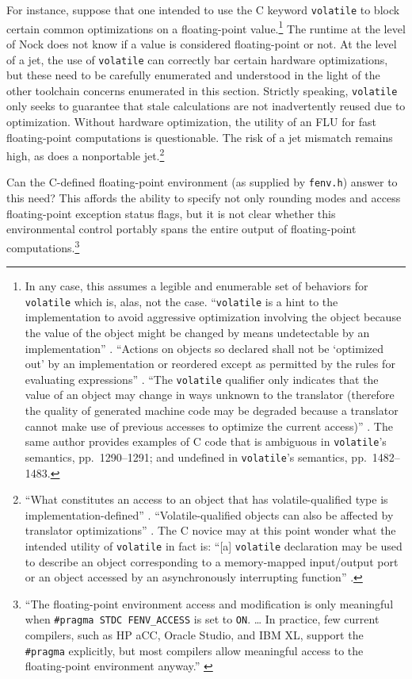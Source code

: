 \documentclass[twoside]{article}
\begin{document}
For instance, suppose that one intended to use the C keyword \texttt{volatile} to block certain common optimizations on a floating-point value.\footnote{In any case, this assumes a legible and enumerable set of behaviors for \texttt{volatile} which is, alas, not the case.  “\texttt{volatile} is a hint to the implementation to avoid aggressive optimization involving the object because the value of the object might be changed by means undetectable by an implementation” \citep[p.~472]{Jones2008}.  “Actions on objects so declared shall not be ‘optimized out’ by an implementation or reordered except as permitted by the rules for evaluating expressions” \citep[p.~1500]{Jones2008}.  “The \texttt{volatile} qualifier only indicates that the value of an object may change in ways unknown to the translator (therefore the quality of generated machine code may be degraded because a translator cannot make use of previous accesses to optimize the current access)” \citep[p.~963]{Jones2008}.  The same author provides examples of C code that is ambiguous in \texttt{volatile}'s semantics, pp.~1290–1291; and undefined in \texttt{volatile}'s semantics, pp.~1482–1483.}  The runtime at the level of Nock does not know if a value is considered floating-point or not.  At the level of a jet, the use of \texttt{volatile} can correctly bar certain hardware optimizations, but these need to be carefully enumerated and understood in the light of the other toolchain concerns enumerated in this section.  Strictly speaking, \texttt{volatile} only seeks to guarantee that stale calculations are not inadvertently reused due to optimization.  Without hardware optimization, the utility of an FLU for fast floating-point computations is questionable.  The risk of a jet mismatch remains high, as does a nonportable jet.\footnote{“What constitutes an access to an object that has volatile-qualified type is implementation-defined” \citep[p.~1488]{Jones2008}.  “Volatile-qualified objects can also be affected by translator optimizations” \citep[p.~1490]{Jones2008}.  The C novice may at this point wonder what the intended utility of \texttt{volatile} in fact is:  “[a] \texttt{volatile} declaration may be used to describe an object corresponding to a memory-mapped input/output port or an object accessed by an asynchronously interrupting function” \citep[p.~1499]{Jones2008}.}

Can the C-defined floating-point environment (as supplied by \texttt{fenv.h}) answer to this need?  This affords the ability to specify not only rounding modes and access floating-point exception status flags, but it is not clear whether this environmental control portably spans the entire output of floating-point computations.\footnote{“The floating-point environment access and modification is only meaningful when \texttt{\#pragma STDC FENV\_ACCESS} is set to \texttt{ON}.  \ldots{} In practice, few current compilers, such as HP aCC, Oracle Studio, and IBM XL, support the \texttt{\#pragma} explicitly, but most compilers allow meaningful access to the floating-point environment anyway.” \citep{CPPRef}}
\end{document}
